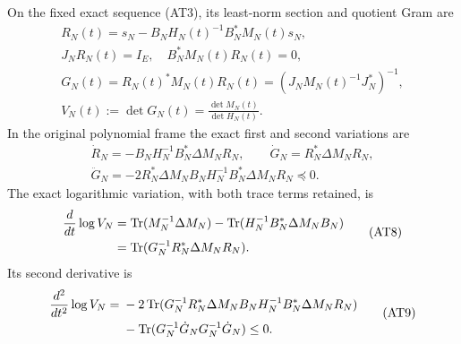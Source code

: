 \begin{theorem}
On the fixed exact sequence (AT3), its least-norm section and quotient
Gram are
\[
 \begin{gathered}
 R_N(t)=s_N-B_NH_N(t)^{-1}B_N^*M_N(t)s_N,\\
 J_NR_N(t)=I_E,\quad B_N^*M_N(t)R_N(t)=0,\\
 G_N(t)=R_N(t)^*M_N(t)R_N(t)
       =(J_NM_N(t)^{-1}J_N^*)^{-1},\\
 V_N(t):=\det G_N(t)=\frac{\det M_N(t)}{\det H_N(t)}.
                                                        \end{gathered}
 \tag{AT6}
\]
In the original polynomial frame the exact first and second variations
are
\[
 \begin{gathered}
 \dot R_N=-B_NH_N^{-1}B_N^*\Delta M_NR_N,\qquad
 \dot G_N=R_N^*\Delta M_NR_N,\\
 \ddot G_N=-2R_N^*\Delta M_NB_NH_N^{-1}B_N^*\Delta M_NR_N
            \preceq0.                                \end{gathered}
 \tag{AT7}
\]
The exact logarithmic variation, with both trace terms retained, is
\[
 \begin{split}
 \frac{d}{dt}\log V_N
 &=\operatorname{Tr}(M_N^{-1}\Delta M_N)
   -\operatorname{Tr}(H_N^{-1}B_N^*\Delta M_NB_N)\\
 &=\operatorname{Tr}(G_N^{-1}R_N^*\Delta M_NR_N).             \end{split}
 \tag{AT8}
\]
Its second derivative is
\[
 \begin{split}
 \frac{d^2}{dt^2}\log V_N
 ={}&-2\operatorname{Tr}(G_N^{-1}R_N^*\Delta M_NB_NH_N^{-1}
                         B_N^*\Delta M_NR_N)\\
    &-\operatorname{Tr}(G_N^{-1}\dot G_NG_N^{-1}\dot G_N)\le0.
                                                        \end{split}
 \tag{AT9}
\]
\end{theorem}

